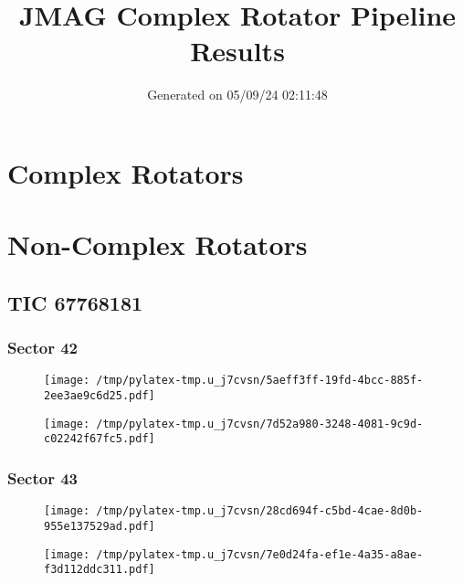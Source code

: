\documentclass{report}%
\title{JMAG Complex Rotator Pipeline Results}%
\date{Generated on 05/09/24 02:11:48}%
\begin{document}
%
\normalsize%
\maketitle%
\tableofcontents%
\chapter{Complex Rotators}%
\label{chap:ComplexRotators}%

%
\chapter{Non{-}Complex Rotators}%
\label{chap:Non{-}ComplexRotators}%
\section{TIC 67768181}%
\label{sec:TIC67768181}%
\subsection{Sector 42}%
\label{subsec:6776818142}%


\begin{figure}[H]%
\centering%
\centering%
\texttt{[image: /tmp/pylatex-tmp.u\_j7cvsn/5aeff3ff-19fd-4bcc-885f-2ee3ae9c6d25.pdf]}%
\end{figure}

%


\begin{figure}[H]%
\centering%
\texttt{[image: /tmp/pylatex-tmp.u\_j7cvsn/7d52a980-3248-4081-9c9d-c02242f67fc5.pdf]}%
\end{figure}

%
\subsection{Sector 43}%
\label{subsec:6776818143}%


\begin{figure}[H]%
\centering%
\centering%
\texttt{[image: /tmp/pylatex-tmp.u\_j7cvsn/28cd694f-c5bd-4cae-8d0b-955e137529ad.pdf]}%
\end{figure}

%


\begin{figure}[H]%
\centering%
\texttt{[image: /tmp/pylatex-tmp.u\_j7cvsn/7e0d24fa-ef1e-4a35-a8ae-f3d112ddc311.pdf]}%
\end{figure}
\end{document}

